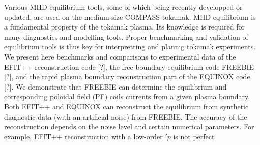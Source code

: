 Various MHD equilibrium tools, some of which being recently developped or updated, are used on the medium-size COMPASS tokamak. MHD equilibrium is a fundamental property of the tokamak plasma. Its knowledge is required for many diagnostics and modelling tools. Proper benchmarking and validation of equilibrium tools is thus key for interpretting and plannig tokamak experiments. We present here benchmarks and comparisons to experimental data of the EFIT++ reconstruction code [?], the free-boundary equilibrium code FREEBIE [?], and the rapid plasma boundary reconstruction part of the EQUINOX code [?]. We demonstrate that FREEBIE can determine the equilibrium and corresponding poloidal field (PF) coils currents from a given plasma boundary. Both EFIT++ and EQUINOX can reconstruct the equilibrium from synthetic diagnostic data (with an artificial noise) from FREEBIE. The accuracy of the reconstruction depends on the noise level and certain numerical parameters. For example, EFIT++ reconstruction with a low-order $\prime{p}$ is not perfect